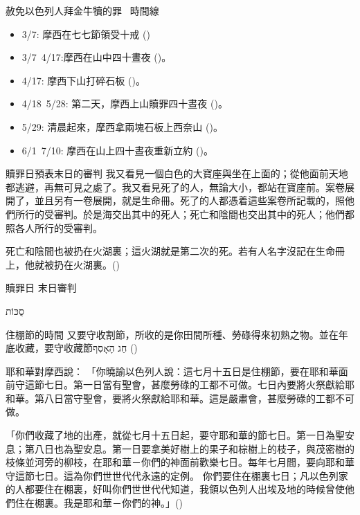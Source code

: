 \documentclass{beamer}
\newcommand{\topic}[1]{
  \begin{frame}
    \centering
    \vspace*{1cm}
    {\fontsize{40}{48}\selectfont #1\par}
    \vfill
  \end{frame}
}
\newcommand{\conclusion}[2]{
  \begin{frame}
    \centering
    \vspace*{1cm}
    {\fontsize{40}{48}\selectfont #1 \textemdash #2\par}
    \vfill
  \end{frame}
}
\newcommand{\parvspace}{\par\vspace{0.5em}}
\begin{document}
\begin{frame}{赦免以色列人拜金牛犢的罪 \textendash\ 時間線}
  \begin{itemize}
    \item 3/7: 摩西在七七節領受十戒 ()\parencite{TenCommandmentsOnShavuot}
    \item 3/7\textendash\ 4/17:摩西在山中\alert{四十晝夜} ()。
    \item 4/17: 摩西下山打碎石板 ()。
    \item 4/18\textendash\ 5/28: \alert{第二天}，摩西上山贖罪\alert{四十晝夜} ()。
    \item 5/29: \alert{清晨起來}，摩西拿兩塊石板上西奈山 ()。
    \item 6/1\textendash\ \alert{7/10}: 摩西在山上\alert{四十晝夜}重新立約 ()。
  \end{itemize}
\end{frame}

\begin{frame}{贖罪日預表末日的審判}
  我又看見一個白色的大寶座與坐在上面的；從他面前天地都逃避，再無可見之處了。我又看見死了的人，無論大小，都站在寶座前。案卷展開了，並且另有一卷展開，就是生命冊。\alert{死了的人都憑着這些案卷所記載的，照他們所行的受審判}。於是海交出其中的死人；死亡和陰間也交出其中的死人；他們都照各人所行的受審判。\parvspace
  死亡和陰間也被扔在火湖裏；這火湖就是第二次的死。\alert{若有人名字沒記在生命冊上，他就被扔在火湖裏}。()\parvspace
\end{frame}

\conclusion{贖罪日}{末日審判}

\topic{\texthebrew{סֻכּוֹת}}

\begin{frame}{住棚節的時間}
  又要守收割節，所收的是你田間所種、勞碌得來初熟之物。並在年底收藏，要守\alert{收藏節\texthebrew{חַג הָאָסִף}} ()\parvspace
  耶和華對摩西說： 「你曉諭以色列人說：這\alert{七月十五日是住棚節，要在耶和華面前守這節七日}。第一日當有聖會，甚麼勞碌的工都不可做。七日內要將火祭獻給耶和華。\alert{第八日當守聖會}，要將火祭獻給耶和華。這是嚴肅會，甚麼勞碌的工都不可做。\parvspace
  \textellipsis{}\parvspace
  「你們收藏了地的出產，就\alert{從七月十五日起，要守耶和華的節七日。第一日為聖安息；第八日也為聖安息}。第一日要拿美好樹上的果子和棕樹上的枝子，與茂密樹的枝條並河旁的柳枝，在耶和華－你們的神面前歡樂七日。每年七月間，要向耶和華守這節七日。這為你們世世代代永遠的定例。 \alert{你們要住在棚裏七日；凡以色列家的人都要住在棚裏，好叫你們世世代代知道，我領以色列人出埃及地的時候曾使他們住在棚裏。我是耶和華－你們的神}。」()\parvspace
\end{frame}
\end{document}
